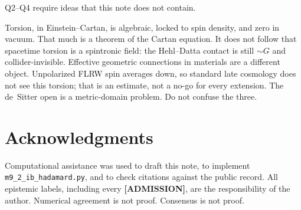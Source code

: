 \documentclass[11pt]{article}
\theoremstyle{definition}
\newcommand{\pA}{\textbf{[ADMISSION]}}
\begin{document}
Q2--Q4 require ideas that this note does not contain.

Torsion, in Einstein--Cartan, is algebraic, locked to spin density,
and zero in vacuum. That much is a theorem of the Cartan equation.
It does not follow that spacetime torsion is a spintronic field:
the Hehl--Datta contact is still $\sim G$ and collider-invisible.
Effective geometric connections in materials are a different object.
Unpolarized FLRW spin averages down, so standard late cosmology
does not see this torsion; that is an estimate, not a no-go for
every extension. The de~Sitter open is a metric-domain problem.
Do not confuse the three.

\section*{Acknowledgments}

Computational assistance was used to draft this note, to implement
\texttt{m9\_2\_ib\_hadamard.py}, and to check citations against the
public record. All epistemic labels, including every \pA{}, are
the responsibility of the author. Numerical agreement is not proof.
Consensus is not proof.
\end{document}
